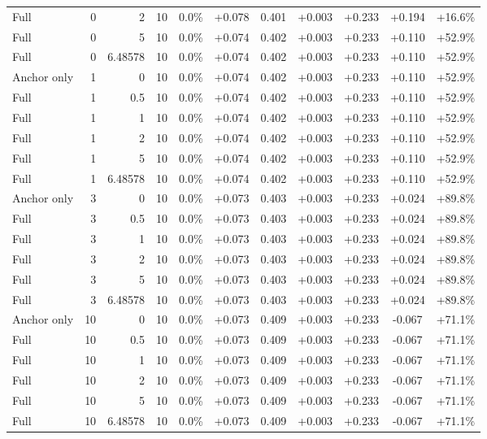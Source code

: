 \begin{table}[htbp]
\begin{tabular}{lrrrccccccc}
Full & 0 & 2 & 10 & 0.0\% & +0.078 & 0.401 & +0.003 & +0.233 & +0.194 & +16.6\% \\
Full & 0 & 5 & 10 & 0.0\% & +0.074 & 0.402 & +0.003 & +0.233 & +0.110 & +52.9\% \\
Full & 0 & 6.48578 & 10 & 0.0\% & +0.074 & 0.402 & +0.003 & +0.233 & +0.110 & +52.9\% \\
Anchor only & 1 & 0 & 10 & 0.0\% & +0.074 & 0.402 & +0.003 & +0.233 & +0.110 & +52.9\% \\
Full & 1 & 0.5 & 10 & 0.0\% & +0.074 & 0.402 & +0.003 & +0.233 & +0.110 & +52.9\% \\
Full & 1 & 1 & 10 & 0.0\% & +0.074 & 0.402 & +0.003 & +0.233 & +0.110 & +52.9\% \\
Full & 1 & 2 & 10 & 0.0\% & +0.074 & 0.402 & +0.003 & +0.233 & +0.110 & +52.9\% \\
Full & 1 & 5 & 10 & 0.0\% & +0.074 & 0.402 & +0.003 & +0.233 & +0.110 & +52.9\% \\
Full & 1 & 6.48578 & 10 & 0.0\% & +0.074 & 0.402 & +0.003 & +0.233 & +0.110 & +52.9\% \\
Anchor only & 3 & 0 & 10 & 0.0\% & +0.073 & 0.403 & +0.003 & +0.233 & +0.024 & +89.8\% \\
Full & 3 & 0.5 & 10 & 0.0\% & +0.073 & 0.403 & +0.003 & +0.233 & +0.024 & +89.8\% \\
Full & 3 & 1 & 10 & 0.0\% & +0.073 & 0.403 & +0.003 & +0.233 & +0.024 & +89.8\% \\
Full & 3 & 2 & 10 & 0.0\% & +0.073 & 0.403 & +0.003 & +0.233 & +0.024 & +89.8\% \\
Full & 3 & 5 & 10 & 0.0\% & +0.073 & 0.403 & +0.003 & +0.233 & +0.024 & +89.8\% \\
Full & 3 & 6.48578 & 10 & 0.0\% & +0.073 & 0.403 & +0.003 & +0.233 & +0.024 & +89.8\% \\
Anchor only & 10 & 0 & 10 & 0.0\% & +0.073 & 0.409 & +0.003 & +0.233 & -0.067 & +71.1\% \\
Full & 10 & 0.5 & 10 & 0.0\% & +0.073 & 0.409 & +0.003 & +0.233 & -0.067 & +71.1\% \\
Full & 10 & 1 & 10 & 0.0\% & +0.073 & 0.409 & +0.003 & +0.233 & -0.067 & +71.1\% \\
Full & 10 & 2 & 10 & 0.0\% & +0.073 & 0.409 & +0.003 & +0.233 & -0.067 & +71.1\% \\
Full & 10 & 5 & 10 & 0.0\% & +0.073 & 0.409 & +0.003 & +0.233 & -0.067 & +71.1\% \\
Full & 10 & 6.48578 & 10 & 0.0\% & +0.073 & 0.409 & +0.003 & +0.233 & -0.067 & +71.1\% \\

\end{tabular}
\end{table}
